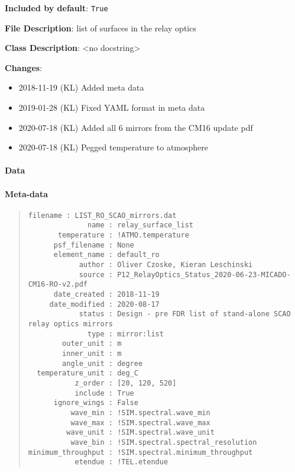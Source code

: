 \textbf{Included by default}: \texttt{True}

\textbf{File Description}: list of surfaces in the relay optics

\textbf{Class Description}: <no docstring>

\textbf{Changes}:

\begin{itemize}
\item 2018-11-19 (KL) Added meta data

\item 2019-01-28 (KL) Fixed YAML format in meta data

\item 2020-07-18 (KL) Added all 6 mirrors from the CM16 update pdf

\item 2020-07-18 (KL) Pegged temperature to atmosphere
\end{itemize}


\paragraph{Data%
  \label{id1}%
}


\paragraph{Meta-data%
  \label{id2}%
}

\begin{quote}
\begin{alltt}
\begin{lstlisting}[frame=single]
          filename : LIST_RO_SCAO_mirrors.dat
              name : relay_surface_list
       temperature : !ATMO.temperature
      psf_filename : None
      element_name : default_ro
            author : Oliver Czoske, Kieran Leschinski
            source : P12_RelayOptics_Status_2020-06-23-MICADO-CM16-RO-v2.pdf
      date_created : 2018-11-19
     date_modified : 2020-08-17
            status : Design - pre FDR list of stand-alone SCAO relay optics mirrors
              type : mirror:list
        outer_unit : m
        inner_unit : m
        angle_unit : degree
  temperature_unit : deg_C
           z_order : [20, 120, 520]
           include : True
      ignore_wings : False
          wave_min : !SIM.spectral.wave_min
          wave_max : !SIM.spectral.wave_max
         wave_unit : !SIM.spectral.wave_unit
          wave_bin : !SIM.spectral.spectral_resolution
minimum_throughput : !SIM.spectral.minimum_throughput
           etendue : !TEL.etendue
\end{lstlisting}
\end{alltt}
\end{quote}
